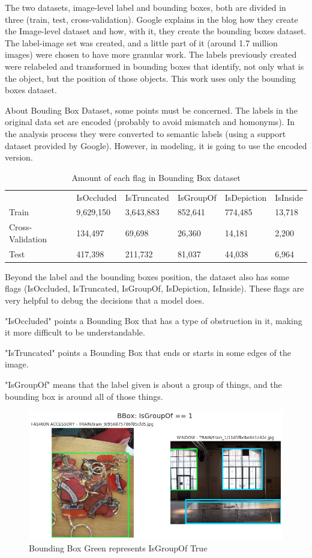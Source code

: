 \documentclass[11pt, a4paper, twocolumn]{article}
\begin{document}
The two datasets, image-level label and bounding boxes, both are divided in three (train, test, cross-validation). Google explains in the blog \cite{imgdataset} how they create the Image-level dataset and how, with it, they create the bounding boxes dataset. The label-image set was created, and a little part of it (around 1.7 million images) were chosen to have more granular work. The labels previously created were relabeled and transformed in bounding boxes that identify, not only what is the object, but the position of those objects. This work uses only the bounding boxes dataset.

About Bouding Box Dataset, some points must be concerned.
The labels in the original data set are encoded (probably to avoid mismatch and homonyms). In the analysis process they were converted to semantic labels (using a support dataset provided by Google). However, in modeling, it is going to use the encoded version. 

\begin{table}[!ht]
	\footnotesize
	\centering
	\caption{ \footnotesize Amount of each flag in Bounding Box dataset }
	\label{table2}
	\begin{tabular}{llllll}
		& IsOccluded & IsTruncated & IsGroupOf & IsDepiction & IsInside \\
		\rowcolor[HTML]{EFEFEF} 
		Train            & 9,629,150  & 3,643,883   & 852,641   & 774,485     & 13,718   \\
		Cross-Validation & 134,497    & 69,698      & 26,360    & 14,181      & 2,200    \\
		\rowcolor[HTML]{EFEFEF} 
		Test             & 417,398    & 211,732     & 81,037    & 44,038      & 6,964   
	\end{tabular}
\end{table}

Beyond the label and the bounding boxes position, the dataset also has some flags (IsOccluded, IsTruncated, IsGroupOf, IsDepiction, IsInside). These flags are very helpful to debug the decisions that a model does.

"IsOccluded" points a Bounding Box that has a type of obstruction in it, making it more difficult to be understandable.

"IsTruncated" points a Bounding Box that ends or starts in some edges of the image.

"IsGroupOf" means that the label given is about a group of things, and the bounding box is around all of those things.

\begin{figure}[!ht]
	\centering
	\includegraphics[width=.5\textwidth]{isgroupof-true.png}
	\caption{\scriptsize Bounding Box Green represents IsGroupOf True }
\end{figure}
\end{document}
